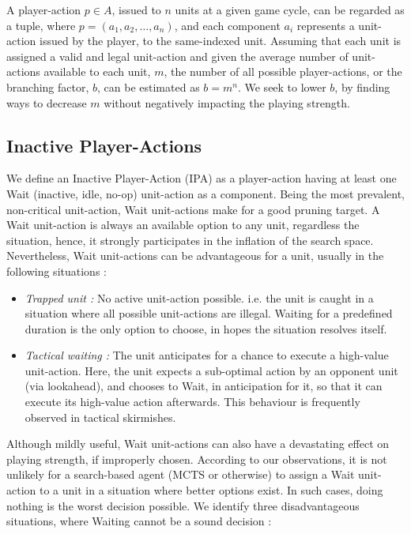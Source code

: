 \documentclass[conference]{IEEEtran}
\begin{document}
A player-action $p \in A$, issued to $n$ units at a given game cycle, can be regarded as a tuple, where $p = (a_1, a_2, \dots, a_n)$, and each component $a_i$ represents a unit-action issued by the player, to the same-indexed unit. Assuming that each unit is assigned a valid and legal unit-action and given the average number of unit-actions available to each unit, $m$, the number of all possible player-actions, or the branching factor, $b$, can be estimated as $b = m^n$. We seek to lower $b$, by finding ways to decrease $m$ without negatively impacting the playing strength.


\subsection{Inactive Player-Actions}

We define an Inactive Player-Action (IPA) as a player-action having at least one Wait (inactive, idle, no-op) unit-action as a component. Being the most prevalent, non-critical unit-action, Wait unit-actions make for a good pruning target. A Wait unit-action is always an available option to any unit, regardless the situation, hence, it strongly participates in the inflation of the search space. Nevertheless, Wait unit-actions can be advantageous for a unit, usually in the following situations :

\begin{itemize}
\item \textit{Trapped unit :} No active unit-action possible. i.e. the unit is caught in a situation where all possible unit-actions are illegal. Waiting for a predefined duration is the only option to choose, in hopes the situation resolves itself.
\item \textit{Tactical waiting :} The unit anticipates for a chance to execute a high-value unit-action. Here, the unit expects a sub-optimal action by an opponent unit (via lookahead), and chooses to Wait, in anticipation for it, so that it can execute its high-value action afterwards. This behaviour is frequently observed in tactical skirmishes.
\end{itemize}

Although mildly useful, Wait unit-actions can also have a devastating effect on playing strength, if improperly chosen. According to our observations, it is not unlikely for a search-based agent (MCTS or otherwise) to assign a Wait unit-action to a unit in a situation where better options exist. In such cases, doing nothing is the worst decision possible. We identify three disadvantageous situations, where Waiting cannot be a sound decision :
\end{document}
